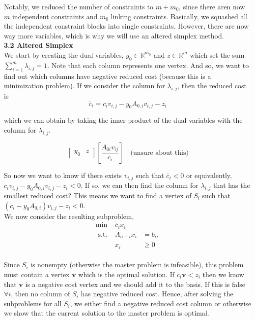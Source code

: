 \documentclass[11pt]{article}
\begin{document}
\noindent Notably, we reduced the number of constraints to $m + m_0$, since there aren now $m$ independent constraints and $m_0$ linking constraints. Basically, we squashed all the independent constraint blocks into single constraints. However, there are now way more variables, which is why we will use an altered simplex method.
\\
\noindent \textbf{3.2 Altered Simplex}
\\

\noindent We start by creating the dual variables, $y_0 \in \mathbb{R}^{m_0}$ and $z \in \mathbb{R}^{m}$ which set the sum $\sum_{i=1}^{m} \lambda_{i, j} =1$. Note that each column represents one vertex. And so, we want to find out which columns have negative reduced cost (because this is a minimization problem). If we consider the column for $\lambda_{i, j}$, then the reduced cost is 
$$ \bar{c}_i = c_i v_{i, j} - y_0 A_{0, i} v_{i, j} - z_i $$

\noindent which we can obtain by taking the inner product of the dual variables with the column for $\lambda_{i, j}$.

$$\left[\begin{array}{ll}
    y_0 & z 
    \end{array} \right]\left[\frac{A_{0 i} v_{i j}}{c_i}\right] \quad \text{(unsure about this)}
    $$

\noindent So now we want to know if there exists $v_{i, j}$ such that $\bar{c}_i < 0$ or equivalently, $c_i v_{i, j} - y_0 A_{0, i} v_{i, j} - z_i < 0$. If so, we can then find the column for $\lambda_{i, j}$ that has the smallest reduced cost? This means we want to find a vertex of $S_i$ such that $(c_i - y_0 A_{0, i}) v_{i, j} - z_i < 0$.
\\

\noindent We now consider the resulting subproblem,
\\
$$
\begin{array}{rcl}
    \min & \bar{c}_i x_i & \\
    \text { s.t. } & A_{n+i} x_i & =b_i, \\
    & x_i & \geq 0
\end{array}
$$
\\

\noindent Since $S_i$ is nonempty (otherwise the master problem is infeasible), this problem must contain a vertex $\textbf{v}$ which is the optimal solution. If $\bar{c}_i\textbf{v}<z_i$ then we know that $\textbf{v}$ is a negative cost vertex and we should add it to the basis. If this is false $\forall i$, then no column of $S_i$ has negative reduced cost. Hence, after solving the subproblems for all $S_i$, we either find a negative reduced cost column or otherwise we show that the current solution to the master problem is optimal.
\\
\end{document}
